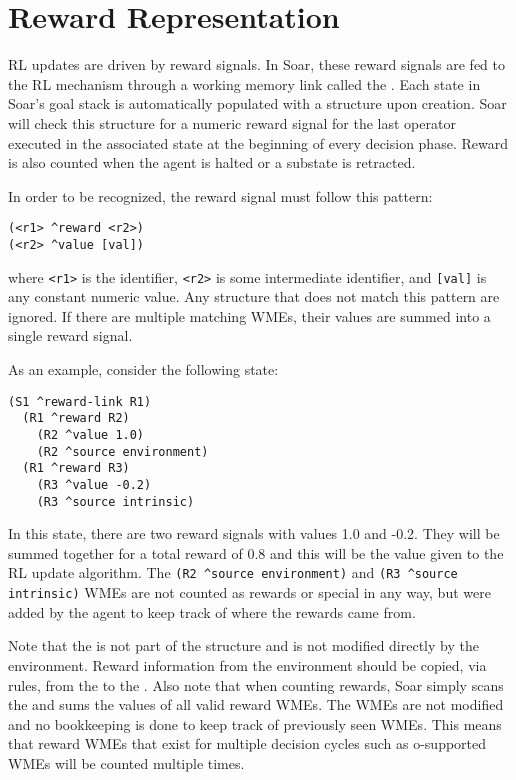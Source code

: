 \section{Reward Representation}
\label{RL-reward}

RL updates are driven by reward signals.
In Soar, these reward signals are fed to the RL mechanism through a working memory link called the .
Each state in Soar's goal stack is automatically populated with a  structure upon creation.
Soar will check this structure for a numeric reward signal for the last operator executed in the associated state at the beginning of every decision phase.
Reward is also counted when the agent is halted or a substate is retracted.

In order to be recognized, the reward signal must follow this pattern:

\begin{verbatim}
(<r1> ^reward <r2>)
(<r2> ^value [val])
\end{verbatim}

where \verb=<r1>= is the  identifier, \verb=<r2>= is some intermediate identifier, and \verb=[val]= is any constant numeric value.
Any structure that does not match this pattern are ignored.
If there are multiple matching WMEs, their values are summed into a single reward signal.

As an example, consider the following state:

\begin{verbatim}
(S1 ^reward-link R1)
  (R1 ^reward R2)
    (R2 ^value 1.0)
    (R2 ^source environment)
  (R1 ^reward R3)
    (R3 ^value -0.2)
    (R3 ^source intrinsic)
\end{verbatim}  

In this state, there are two reward signals with values 1.0 and -0.2.
They will be summed together for a total reward of 0.8 and this will be the value given to the RL update algorithm.
The \verb=(R2 ^source environment)= and \verb=(R3 ^source intrinsic)= WMEs are not counted as rewards or special in any way, but were added by the agent to keep track of where the rewards came from.

Note that the  is not part of the  structure and is not modified directly by the environment.
Reward information from the environment should be copied, via rules, from the  to the .
Also note that when counting rewards, Soar simply scans the  and sums the values of all valid reward WMEs.
The WMEs are not modified and no bookkeeping is done to keep track of previously seen WMEs.
This means that reward WMEs that exist for multiple decision cycles such as o-supported WMEs will be counted multiple times.

